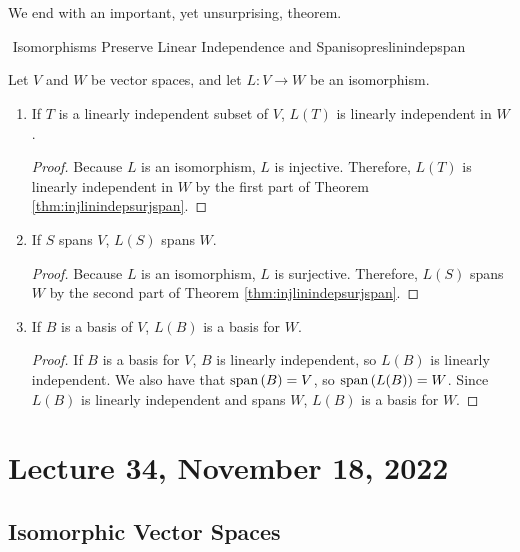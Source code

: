        \pagebreak
        \vphantom
        \\
        \\
        We end with an important, yet unsurprising, theorem.
        \begin{theorem}{\Stop\,\,Isomorphisms Preserve Linear Independence and Span}{isopreslinindepspan}
            
            Let \(V\) and \(W\) be vector spaces, and let \(L:V\to W\) be an isomorphism.
            \begin{enumerate}
                \item If \(T\) is a linearly independent subset of \(V\), \(L(T)\) is linearly independent in \(W\).
                \begin{proof}
                    Because \(L\) is an isomorphism, \(L\) is injective. Therefore, \(L(T)\) is linearly independent in \(W\) by the first part of Theorem \ref{thm:injlinindepsurjspan}.
                \end{proof}
                \item If \(S\) spans \(V\), \(L(S)\) spans \(W\).
                \begin{proof}
                    Because \(L\) is an isomorphism, \(L\) is surjective. Therefore, \(L(S)\) spans \(W\) by the second part of Theorem \ref{thm:injlinindepsurjspan}.
                \end{proof}
                \item If \(B\) is a basis of \(V\), \(L(B)\) is a basis for \(W\).
                \begin{proof}
                    If \(B\) is a basis for \(V\), \(B\) is linearly independent, so \(L(B)\) is linearly independent. We also have that \(\text{span\,}(B)=V\), so \(\text{span\,}(L(B))=W\). Since \(L(B)\) is linearly independent and spans \(W\), \(L(B)\) is a basis for \(W\).
                \end{proof}
            \end{enumerate}

        \end{theorem}

        \pagebreak

\section{Lecture 34, November 18, 2022}

    \subsection{Isomorphic Vector Spaces}

